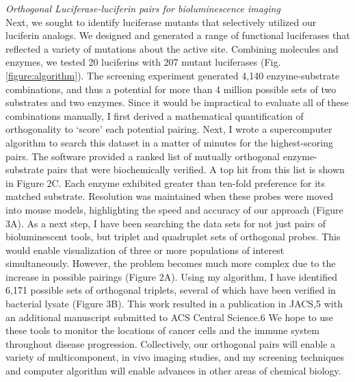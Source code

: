 \documentclass[11pt]{article}
\begin{document}
\textit{Orthogonal Luciferase-luciferin pairs for bioluminescence imaging}\\
Next, we sought to identify luciferase mutants that selectively utilized our luciferin analogs. We designed and generated a range of functional luciferases that reflected a variety of mutations about the active site. Combining molecules and enzymes, we tested 20 luciferins with 207 mutant luciferases (Fig. \ref{figure:algorithm}). The screening experiment generated 4,140 enzyme-substrate combinations, and thus a potential for more than 4 million possible sets of two substrates and two enzymes. Since it would be impractical to evaluate all of these combinations manually, I first derived a mathematical quantification of orthogonality to ‘score’ each potential pairing. Next, I wrote a supercomputer algorithm to search this dataset in a matter of minutes for the highest-scoring pairs. The software provided a ranked list of mutually orthogonal enzyme-substrate pairs that were biochemically verified. A top hit from this list is shown in Figure 2C. Each enzyme exhibited greater than ten-fold preference for its matched substrate. Resolution was maintained when these probes were moved into mouse models, highlighting the speed and accuracy of our approach (Figure 3A). As a next step, I have been searching the data sets for not just pairs of bioluminescent tools, but triplet and quadruplet sets of orthogonal probes. This would enable visualization of three or more populations of interest simultaneously. However, the problem becomes much more complex due to the increase in possible pairings (Figure 2A). Using my algorithm, I have identified 6,171 possible sets of orthogonal triplets, several of which have been verified in bacterial lysate (Figure 3B). This work resulted in a publication in JACS,5 with an additional manuscript submitted to ACS Central Science.6 We hope to use these tools to monitor the locations of cancer cells and the immune system throughout disease progression. Collectively, our orthogonal pairs will enable a variety of multicomponent, in vivo imaging studies, and my screening techniques and computer algorithm will enable advances in other areas of chemical biology.
\end{document}

